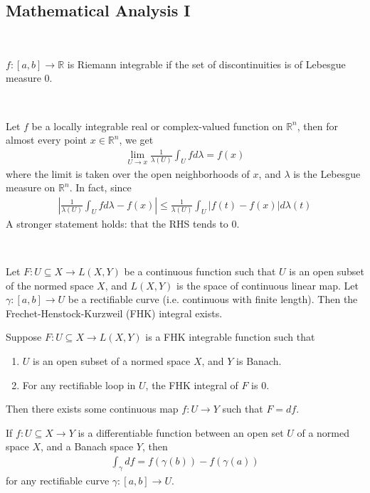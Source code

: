 \documentclass{treatise}
\begin{document}
\begin{shaded}
\chapter{Mathematical Analysis I}
\begin{theorem} \end{theorem}
\ \\
\begin{theorem}
$f: [a, b] \to \mathbb{R}$ is Riemann integrable if the set of discontinuities is of Lebesgue measure 0.
\end{theorem}
\ \\
\begin{theorem}
Let $f$ be a locally integrable real or complex-valued function on $\mathbb{R}^n$, then for almost every point $x \in \mathbb{R}^n$, we get
\begin{align*}
\lim_{U \to x} \frac{1}{\lambda(U)} \int_U f d \lambda = f(x)
\end{align*}
where the limit is taken over the open neighborhoods of $x$, and $\lambda$ is the Lebesgue measure on $\mathbb{R}^n$. In fact, since
\begin{align*}
\left| \frac{1}{\lambda(U)} \int_U f d \lambda - f(x) \right| \leq \frac{1}{\lambda(U)} \int_U |f(t) - f(x)| d \lambda(t)
\end{align*}
A stronger statement holds: that the RHS tends to $0$.
\end{theorem}
\ \\
\begin{theorem}
Let $F: U \subseteq X \to L(X, Y)$ be a continuous function such that $U$ is an open subset of the normed space $X$, and $L(X, Y)$ is the space of continuous linear map. Let $\gamma: [a, b] \to U$ be a rectifiable curve (i.e. continuous with finite length). Then the Frechet-Henstock-Kurzweil (FHK) integral exists.
\end{theorem}
\begin{theorem}
Suppose $F: U \subseteq X \to L(X, Y)$ is a FHK integrable function such that
\begin{enumerate}
    \item $U$ is an open subset of a normed space $X$, and $Y$ is Banach.
    \item For any rectifiable loop in $U$, the FHK integral of $F$ is $0$.
\end{enumerate}
Then there exists some continuous map $f: U \to Y$ such that $F = df$.
\end{theorem}
\begin{theorem}
If $f: U \subseteq X \to Y$ is a differentiable function between an open set $U$ of a normed space $X$, and a Banach space $Y$, then
\begin{align*}
    \int_\gamma df = f(\gamma(b)) - f(\gamma(a))
\end{align*}
for any rectifiable curve $\gamma: [a, b] \to U$.
\end{theorem}


\end{shaded}
\end{document}
